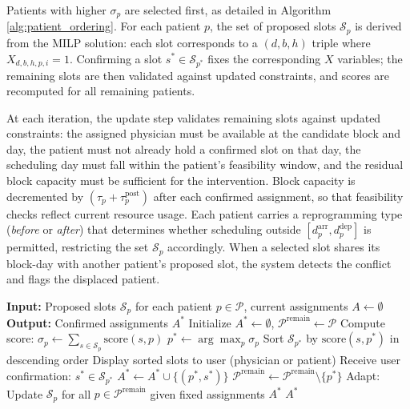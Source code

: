 Patients with higher $\sigma_p$ are selected first, as detailed in Algorithm \ref{alg:patient_ordering}. For each patient $p$, the set of proposed slots $\mathcal{S}_p$ is derived from the MILP solution: each slot corresponds to a $(d,b,h)$ triple where $X_{d,b,h,p,i}=1$. Confirming a slot $s^* \in \mathcal{S}_{p^*}$ fixes the corresponding $X$ variables; the remaining slots are then validated against updated constraints, and scores are recomputed for all remaining patients.

At each iteration, the update step validates remaining slots against updated constraints: the assigned physician must be available at the candidate block and day, the patient must not already hold a confirmed slot on that day, the scheduling day must fall within the patient's feasibility window, and the residual block capacity must be sufficient for the intervention. Block capacity is decremented by $(\tau_p + \tau^{\text{post}}_p)$ after each confirmed assignment, so that feasibility checks reflect current resource usage. Each patient carries a reprogramming type (\emph{before} or \emph{after}) that determines whether scheduling outside $[d^{\text{arr}}_p, d^{\text{dep}}_p]$ is permitted, restricting the set $\mathcal{S}_p$ accordingly. When a selected slot shares its block-day with another patient's proposed slot, the system detects the conflict and flags the displaced patient.

\begin{algorithm}[H]
\caption{Iterative Patient Selection and Confirmation}
\label{alg:patient_ordering}
\begin{algorithmic}[1]
\State \textbf{Input:} Proposed slots $\mathcal{S}_{p}$ for each patient $p \in \mathcal{P}$, current assignments $A \gets \emptyset$
\State \textbf{Output:} Confirmed assignments $A^*$
\State Initialize $A^* \gets \emptyset$, $\mathcal{P}^{\text{remain}} \gets \mathcal{P}$
        \State Compute score: $\sigma_p \gets \sum_{s \in \mathcal{S}_p} \text{score}(s, p)$
    \EndFor
    \State $p^* \gets \arg\max_p \sigma_p$ \quad {}
    \State Sort $\mathcal{S}_{p^*}$ by $\text{score}(s, p^*)$ in descending order
    \State Display sorted slots to user (physician or patient)
    \State Receive user confirmation: $s^* \in \mathcal{S}_{p^*}$
    \State $A^* \gets A^* \cup \{(p^*, s^*)\}$
    \State $\mathcal{P}^{\text{remain}} \gets \mathcal{P}^{\text{remain}} \setminus \{p^*\}$
    \State Adapt: Update $\mathcal{S}_p$ for all $p \in \mathcal{P}^{\text{remain}}$ given fixed assignments $A^*$
\EndWhile
\State \Return $A^*$
\end{algorithmic}
\end{algorithm}
